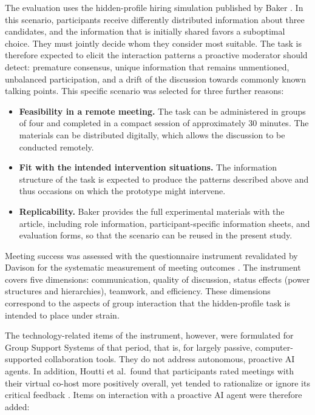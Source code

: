 The evaluation uses the hidden-profile hiring simulation published by Baker
\cite{bakerEnhancingGroupDecision2010}.
In this scenario, participants receive differently distributed information about three candidates,
and the information that is initially shared favors a suboptimal choice.
They must jointly decide whom they consider most suitable.
The task is therefore expected to elicit the interaction patterns a proactive moderator should
detect: premature consensus, unique information that remains unmentioned, unbalanced participation,
and a drift of the discussion towards commonly known talking points.
This specific scenario was selected for three further reasons:

\begin{itemize}
  \item \textbf{Feasibility in a remote meeting.}
    The task can be administered in groups of four and completed in a compact session of
    approximately 30 minutes.
    The materials can be distributed digitally, which allows the discussion to be conducted
    remotely.
  \item \textbf{Fit with the intended intervention situations.}
    The information structure of the task is expected to produce the patterns described above
    and thus occasions on which the prototype might intervene.
  \item \textbf{Replicability.}
    Baker provides the full experimental materials with the article, including role information,
    participant-specific information sheets, and evaluation forms, so that the scenario can be
    reused in the present study.
\end{itemize}

Meeting success was assessed with the questionnaire instrument revalidated by Davison for the
systematic measurement of meeting outcomes
\cite{davisonInstrumentMeasuringMeeting1999}.
The instrument covers five dimensions: communication, quality of discussion, status effects
(power structures and hierarchies), teamwork, and efficiency.
These dimensions correspond to the aspects of group interaction that the hidden-profile task is
intended to place under strain.

The technology-related items of the instrument, however, were formulated for Group Support
Systems of that period, that is, for largely passive, computer-supported collaboration tools.
They do not address autonomous, proactive AI agents.
In addition, Houtti et al.\ found that participants rated meetings with their virtual co-host
more positively overall, yet tended to rationalize or ignore its critical feedback
\cite{houttiObserveAskIntervene2025}.
Items on interaction with a proactive AI agent were therefore added:

